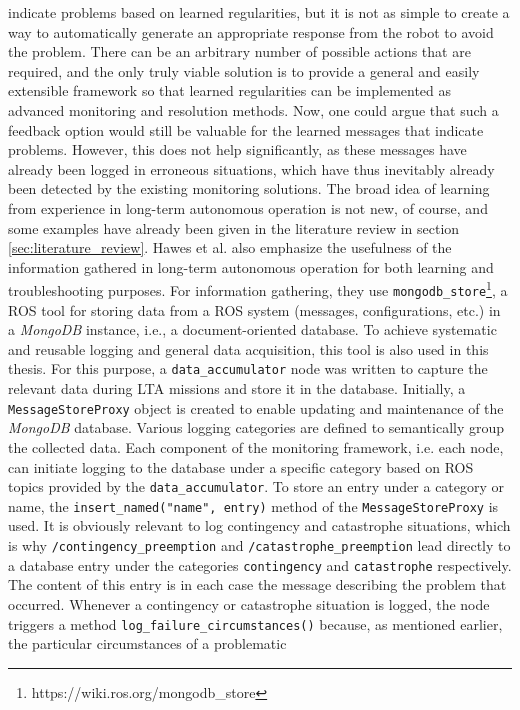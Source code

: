 \documentclass[english, master, utf8]{base/thesis_KBS}
\newcommand{\code}[1]{\colorbox{light-gray}{\texttt{#1}}}
\begin{document}
indicate problems based on learned regularities, but it is not as simple to create a way to automatically generate an appropriate response from the robot to avoid the problem. There
can be an arbitrary number of possible actions that are required, and the only truly viable solution is to provide a general and easily extensible framework so that learned
regularities can be implemented as advanced monitoring and resolution methods. Now, one could argue that such a feedback option would still be valuable for the learned messages that
indicate problems. However, this does not help significantly, as these messages have already been logged in erroneous situations, which have thus inevitably already been detected by
the existing monitoring solutions. The broad idea of learning from experience in long-term autonomous operation is not new, of course, and some examples have already been given in the
literature review in section \ref{sec:literature_review}. Hawes et al. \cite{Hawes:2017} also emphasize the usefulness of the information gathered in long-term autonomous operation for both learning and troubleshooting
purposes. For information gathering, they use \code{mongodb\_store}\footnote{https://wiki.ros.org/mongodb\_store}, a ROS tool for storing data from a ROS system (messages,
configurations, etc.) in a \textit{MongoDB} instance, i.e., a document-oriented database. To achieve systematic and reusable logging and general data acquisition, this tool is also
used in this thesis. For this purpose, a \code{data\_accumulator} node was written to capture the relevant data during LTA missions and store it in the database. Initially, a
\code{MessageStoreProxy} object is created to enable updating and maintenance of the \textit{MongoDB} database. Various logging categories are defined to semantically group the
collected data. Each component of the monitoring framework, i.e. each node, can initiate logging to the database under a specific category based on ROS topics provided by the
\code{data\_accumulator}. To store an entry under a category or name, the \code{insert\_named("name", entry)} method of the \code{MessageStoreProxy} is used. It is obviously relevant
to log contingency and catastrophe situations, which is why \code{/contingency\_preemption} and \code{/catastrophe\_preemption} lead directly to a database entry under the categories
\code{contingency} and \code{catastrophe} respectively. The content of this entry is in each case the message describing the problem that occurred. Whenever a contingency or
catastrophe situation is logged, the node triggers a method \code{log\_failure\_circumstances()} because, as mentioned earlier, the particular circumstances of a problematic
\end{document}
